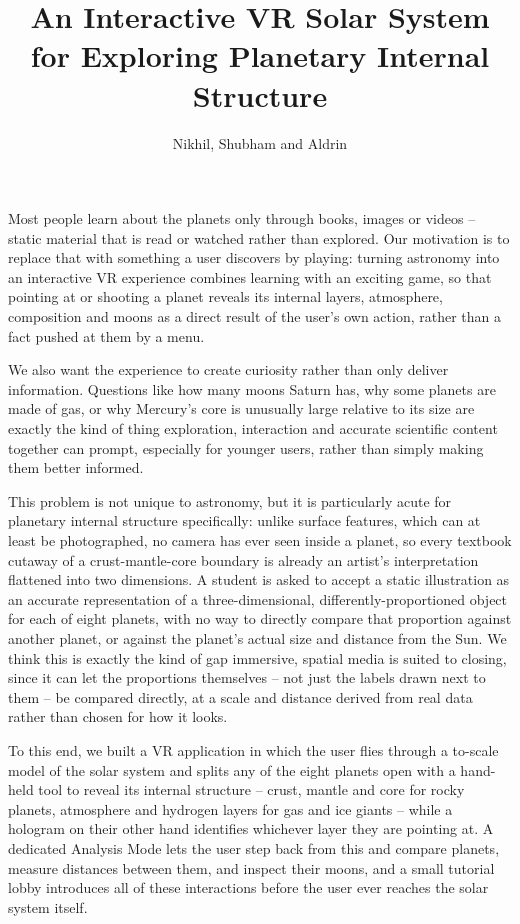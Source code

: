 \documentclass[journal]{vgtc}
\title{An Interactive VR Solar System for Exploring Planetary Internal Structure}
\author{Nikhil, Shubham and Aldrin}
\begin{document}

\maketitle

Most people learn about the planets only through books, images or videos -- static material that is read or watched rather than explored. Our motivation is to replace that with something a user discovers by playing: turning astronomy into an interactive VR experience combines learning with an exciting game, so that pointing at or shooting a planet reveals its internal layers, atmosphere, composition and moons as a direct result of the user's own action, rather than a fact pushed at them by a menu.

We also want the experience to create curiosity rather than only deliver information. Questions like how many moons Saturn has, why some planets are made of gas, or why Mercury's core is unusually large relative to its size are exactly the kind of thing exploration, interaction and accurate scientific content together can prompt, especially for younger users, rather than simply making them better informed.

This problem is not unique to astronomy, but it is particularly acute for planetary internal structure specifically: unlike surface features, which can at least be photographed, no camera has ever seen inside a planet, so every textbook cutaway of a crust-mantle-core boundary is already an artist's interpretation flattened into two dimensions. A student is asked to accept a static illustration as an accurate representation of a three-dimensional, differently-proportioned object for each of eight planets, with no way to directly compare that proportion against another planet, or against the planet's actual size and distance from the Sun. We think this is exactly the kind of gap immersive, spatial media is suited to closing, since it can let the proportions themselves -- not just the labels drawn next to them -- be compared directly, at a scale and distance derived from real data rather than chosen for how it looks.

To this end, we built a VR application in which the user flies through a to-scale model of the solar system and splits any of the eight planets open with a hand-held tool to reveal its internal structure -- crust, mantle and core for rocky planets, atmosphere and hydrogen layers for gas and ice giants -- while a hologram on their other hand identifies whichever layer they are pointing at. A dedicated Analysis Mode lets the user step back from this and compare planets, measure distances between them, and inspect their moons, and a small tutorial lobby introduces all of these interactions before the user ever reaches the solar system itself.
\end{document}
